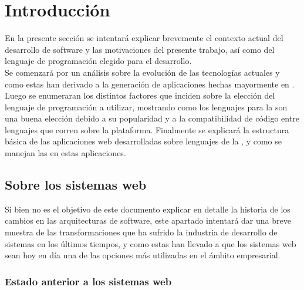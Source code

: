 \section{Introducción}
\label{sec:intro}

En la presente sección se intentará explicar brevemente el contexto actual del desarrollo
de software y las motivaciones del presente trabajo, así como del lenguaje de programación
elegido para el desarrollo.\\
Se comenzará por un análisis sobre la evolución de las tecnologías actuales y como estas
han derivado a la generación de aplicaciones hechas mayormente en \htmlv. Luego se enumeraran
los distintos factores que inciden sobre la elección del lenguaje de programación a
utilizar, mostrando como los lenguajes para la \jvm son una buena elección debido a su
popularidad y a la compatibilidad de código entre lenguajes que corren sobre la
plataforma. Finalmente se explicará la estructura básica de las aplicaciones web desarrolladas
sobre lenguajes de la \jvm, y como se manejan las \dependencies en estas aplicaciones.\\

\subsection{Sobre los sistemas web}
\label{subsec:intro:about_web}

Si bien no es el objetivo de este documento explicar en detalle la historia de los cambios
en las arquitecturas de software, este apartado intentará dar una breve muestra de las
transformaciones que ha sufrido la industria de desarrollo de sistemas en los últimos
tiempos, y como estas han llevado a que los sistemas web sean hoy en día una de las
opciones más utilizadas en el ámbito empresarial.

\subsubsection{Estado anterior a los sistemas web}
\label{subsubsec:intro:about_web:previous_pc}

